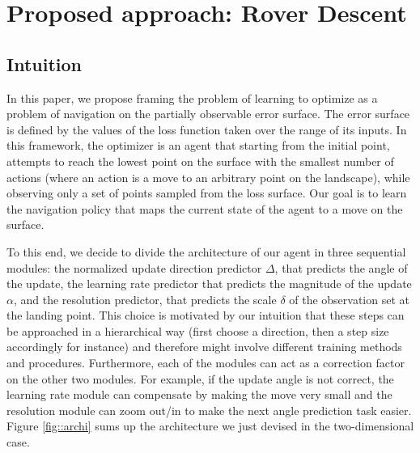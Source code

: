 \chapter[Rover Descent]{Proposed approach: Rover Descent}
	{

\section{Intuition}
	
	In this paper, we propose framing the problem of learning to optimize as a problem of navigation on the partially observable error surface. The error surface is defined by the values of the loss function taken over the range of its inputs. In this framework, the optimizer is an agent that starting from the initial point, attempts to reach the lowest point on the surface with the smallest number of actions (where an action is a move to an arbitrary point on the landscape), while observing only a set of points sampled from the loss surface. Our goal is to learn the navigation policy that maps the current state of the agent to a move on the surface. 
	
	To this end, we decide to divide the architecture of our agent in three sequential modules: the normalized update direction predictor $\Delta$, that predicts the angle of the update, the learning rate predictor that predicts the magnitude of the update $\alpha$, and the resolution predictor, that predicts the scale $\delta$ of the observation set at the landing point. This choice is motivated by our intuition that these steps can be approached in a hierarchical way (first choose a direction, then a step size accordingly for instance) and therefore might involve different training methods and procedures. Furthermore, each of the modules can act as a correction factor on the other two modules. For example, if the update angle is not correct, the learning rate module can compensate by making the move very small and the resolution module can zoom out/in to make the next angle prediction task easier. Figure \ref{fig::archi} sums up the architecture we just devised in the two-dimensional case.
	
}
